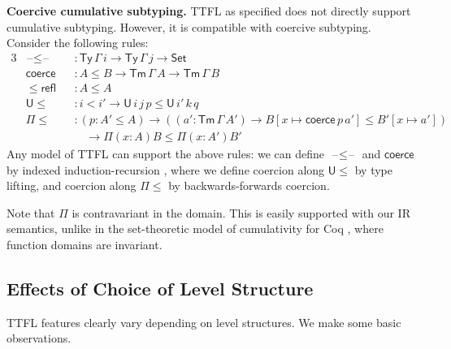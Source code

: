 \documentclass[a4paper,UKenglish,cleveref, autoref, thm-restate]{lipics-v2021}
\theoremstyle{remark}
\theoremstyle{definition}
\newcommand{\Seti}{\mathsf{Set}}
\newcommand{\Ty}{\mathsf{Ty}}
\newcommand{\Tm}{\mathsf{Tm}}
\newcommand{\U}{\mathsf{U}}
\newcommand{\blank}{\mathord{\hspace{1pt}\text{--}\hspace{1pt}}}
\renewcommand{\U}{\mathsf{U}}
\newcommand{\msf}[1]{\mathsf{#1}}
\begin{document}
\textbf{Coercive cumulative subtyping.}
TTFL as specified does not directly support cumulative subtyping. However, it is
compatible with coercive subtyping. Consider the following rules:
\begin{alignat*}{3}
  &\blank\!\leq\!\blank &&: \Ty\,\Gamma\,i \to \Ty\,\Gamma\,j \to \Seti\\
  &\msf{coerce} &&: A \leq B \to \Tm\,\Gamma\,A \to \Tm\,\Gamma\,B\\
  &\leq\!\msf{refl} &&: A \leq A \\
  &\U\!\leq    &&: i < i' \to \U\,i\,j\,p \leq \U\,i'\,k\,q\\
  &\Pi\!\leq   &&: (p : A' \leq A) \to ((a' : \Tm\,\Gamma\,A')
  \to B[x \mapsto \msf{coerce}\,p\,a'] \leq B'[x \mapsto a'])\\
  & && \hspace{1em} \to \Pi(x : A) B \leq \Pi (x : A') B'
\end{alignat*}
Any model of TTFL can support the above rules: we can define
$\blank\!\leq\!\blank$ and $\msf{coerce}$ by indexed induction-recursion
\cite{indexedir}, where we define coercion along $\U\!\leq$ by type lifting, and
coercion along $\Pi\!\leq$ by backwards-forwards coercion.

Note that $\Pi$ is contravariant in the domain. This is easily supported
with our IR semantics, unlike in the set-theoretic model of cumulativity for Coq
\cite{timany2018cumulative}, where function domains are invariant.

\subsection{Effects of Choice of Level Structure}

TTFL features clearly vary depending on level structures. We make some basic
observations.
\end{document}
